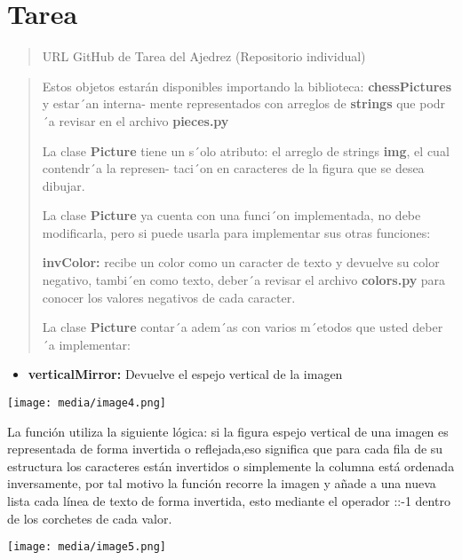 \documentclass[
]{article}
\begin{document}
\hypertarget{tarea}{%
\section{\texorpdfstring{Tarea }{Tarea }}\label{tarea}}

\begin{quote}
URL GitHub de Tarea del Ajedrez (Repositorio individual)
\end{quote}

\begin{quote}
Estos objetos estarán disponibles importando la biblioteca:
\textbf{chessPictures} y estar´an interna- mente representados con
arreglos de \textbf{strings} que podr´a revisar en el archivo
\textbf{pieces.py}

La clase \textbf{Picture} tiene un s´olo atributo: el arreglo de strings
\textbf{img}, el cual contendr´a la represen- taci´on en caracteres de
la figura que se desea dibujar.

La clase \textbf{Picture} ya cuenta con una funci´on implementada, no
debe modificarla, pero si puede usarla para implementar sus otras
funciones:

\textbf{invColor:} recibe un color como un caracter de texto y devuelve
su color negativo, tambi´en como texto, deber´a revisar el archivo
\textbf{colors.py} para conocer los valores negativos de cada caracter.

La clase \textbf{Picture} contar´a adem´as con varios m´etodos que usted
deber´a implementar:
\end{quote}

\begin{itemize}
\item
  \textbf{verticalMirror:} Devuelve el espejo vertical de la imagen
\end{itemize}

\texttt{[image: media/image4.png]}

La función utiliza la siguiente lógica: si la figura espejo vertical de
una imagen es representada de forma invertida o reflejada,eso significa
que para cada fila de su estructura los caracteres están invertidos o
simplemente la columna está ordenada inversamente, por tal motivo la
función recorre la imagen y añade a una nueva lista cada línea de texto
de forma invertida, esto mediante el operador ::-1 dentro de los
corchetes de cada valor.

\texttt{[image: media/image5.png]}
\end{document}
